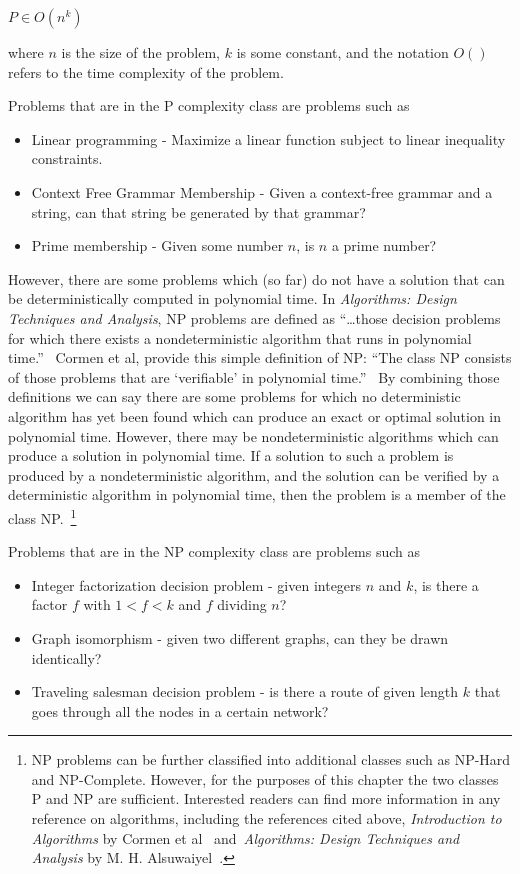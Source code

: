 \(P \in O(n^{k})\)

where \(n\) is the size of the problem, \(k\) is some constant, and the
notation \(O()\) refers to the time complexity of the problem.

Problems that are in the P complexity class are problems such as

\begin{itemize}
\item{Linear programming - Maximize a linear function subject to linear
inequality constraints.} 
\item{Context Free Grammar Membership - Given a context-free grammar and a
string, can that string be generated by that grammar?}
\item {Prime membership - Given some number \(n\), is \(n\) a prime number?}
\end{itemize}

However, there are some problems which (so far) do not have a solution that can
be deterministically computed in polynomial time. In \emph{Algorithms: Design
Techniques and Analysis}, NP problems are defined as ``\ldots those decision
problems for which there exists a nondeterministic algorithm that runs in
polynomial time.''~\cite{alsuwaiyel1999algorithms} Cormen et al, provide this
simple definition of NP: ``The class NP consists of those problems
that are `verifiable' in polynomial time.''~\cite{Cormen:2009:IAT:1614191} By
combining those definitions we can say there are some problems for which no
deterministic algorithm has yet been found which can produce an exact or optimal
solution in polynomial time. However, there may be nondeterministic algorithms
which can produce a solution in polynomial time. If a solution to such a problem
is produced by a nondeterministic algorithm, and the solution can be verified by
a deterministic algorithm in polynomial time, then the problem is a member of
the class NP.~\footnote{NP problems can be further classified into additional
classes such as NP-Hard and NP-Complete. However, for the purposes of this
chapter the two classes P and NP are sufficient. Interested readers can find
more information in any reference on algorithms, including the references cited
above, \emph{Introduction to Algorithms} by Cormen et
al~\cite{Cormen:2009:IAT:1614191} and~\emph{Algorithms: Design Techniques and
Analysis} by M. H. Alsuwaiyel~\cite{alsuwaiyel1999algorithms}.}

Problems that are in the NP complexity class are problems such as

\begin{itemize}
\item{Integer factorization decision problem - given integers \(n\) and \(k\),
is there a factor \(f\) with \(1 < f < k\) and \(f\) dividing \(n\)?}
\item{Graph isomorphism - given two different graphs, can they be drawn
identically?}
\item{Traveling salesman decision problem - is there a route of given length
\(k\) that goes through all the nodes in a certain network?}
\end{itemize}

